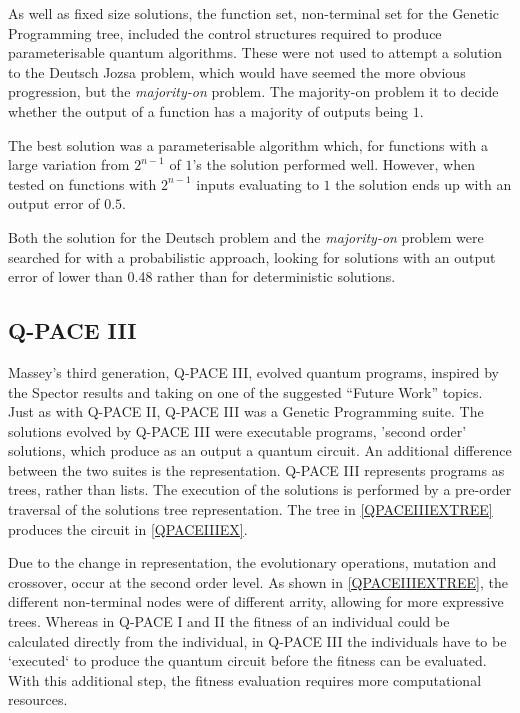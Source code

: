 \documentclass[authoryearcitations]{UoYCSproject}
\begin{document}
As well as fixed size solutions, the function set, non-terminal set for the Genetic Programming tree, included the control structures required to produce parameterisable quantum algorithms.
These were not used to attempt a solution to the Deutsch Jozsa problem, which would have seemed the more obvious progression, but the \emph{majority-on} problem.
The majority-on problem it to decide whether the output of a function has a majority of outputs being $1$.

The best solution was a parameterisable algorithm which, for functions with a large variation from $2^{n-1}$ of $1$'s the solution performed well.
However, when tested on functions with $2^{n-1}$ inputs evaluating to $1$ the solution ends up with an output error of $0.5$.

Both the solution for the Deutsch problem and the \emph{majority-on} problem were searched for with a probabilistic approach, looking for solutions with an output error of lower than 0.48 rather than for deterministic solutions.

\subsection{Q-PACE III}
Massey's third generation, Q-PACE III, evolved quantum programs, inspired by the Spector\cite{LSpectorGPforQC,LSpectorANDOR,Spector:1999:QCA:316573.317112} results and taking on one of the suggested ``Future Work'' topics.
Just as with Q-PACE II, Q-PACE III was a Genetic Programming suite.
The solutions evolved by Q-PACE III were executable programs, 'second order' solutions, which produce as an output a quantum circuit.
An additional difference between the two suites is the representation.
Q-PACE III represents programs as trees, rather than lists.
The execution of the solutions is performed by a pre-order traversal of the solutions tree representation.
The tree in \ref{QPACEIIIEXTREE} produces the circuit in \ref{QPACEIIIEX}.

Due to the change in representation, the evolutionary operations, mutation and crossover, occur at the second order level.
As shown in \ref{QPACEIIIEXTREE}, the different non-terminal nodes were of different arrity, allowing for more expressive trees.
Whereas in Q-PACE I and II the fitness of an individual could be calculated directly from the individual, in Q-PACE III the individuals have to be `executed` to produce the quantum circuit before the fitness can be evaluated.
With this additional step, the fitness evaluation requires more computational resources.
\end{document}
